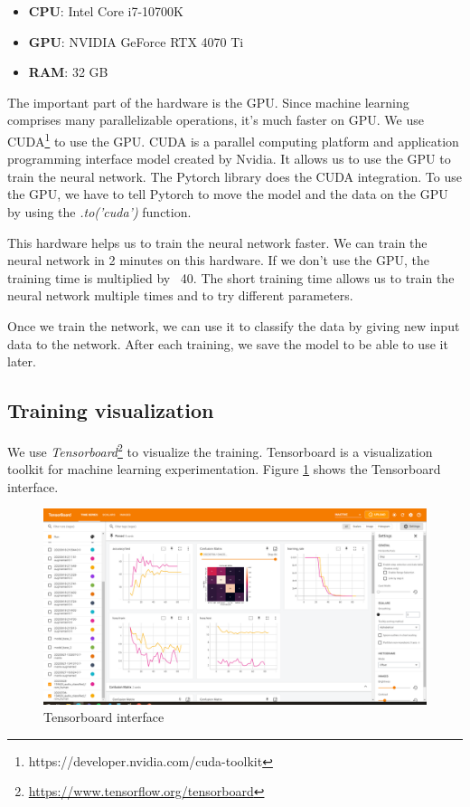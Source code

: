 \begin{itemize}
    \item \textbf{CPU}: Intel Core i7-10700K
    \item \textbf{GPU}: NVIDIA GeForce RTX 4070 Ti
    \item \textbf{RAM}: 32 GB
\end{itemize}

The important part of the hardware is the GPU. Since machine learning comprises many parallelizable operations, it's much faster on GPU. We use CUDA\footnote{https://developer.nvidia.com/cuda-toolkit} to use the GPU. CUDA is a parallel computing platform and application programming interface model created by Nvidia. It allows us to use the GPU to train the neural network. The Pytorch library does the CUDA integration. To use the GPU, we have to tell Pytorch to move the model and the data on the GPU by using the \textit{.to('cuda')} function.

This hardware helps us to train the neural network faster. We can train the neural network in 2 minutes on this hardware. If we don't use the GPU, the training time is multiplied by ~40. The short training time allows us to train the neural network multiple times and to try different parameters.

Once we train the network, we can use it to classify the data by giving new input data to the network. After each training, we save the model to be able to use it later.

\subsection{Training visualization}

We use \textit{Tensorboard}\footnote{\url{https://www.tensorflow.org/tensorboard}} to visualize the training. Tensorboard is a visualization toolkit for machine learning experimentation. Figure \ref{fig:tensorboard} shows the Tensorboard interface.

\begin{figure}[H]
    \centering
    \includegraphics[width=.8\textwidth]{images/tensorboard.png}
    \caption{Tensorboard interface}
    \label{fig:tensorboard}
\end{figure}

